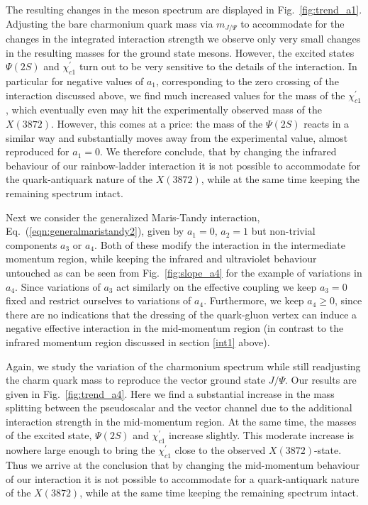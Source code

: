 The resulting changes in the meson spectrum are displayed in 
Fig.~\ref{fig:trend_a1}. Adjusting the bare charmonium quark mass via $m_{J/\Psi}$
to accommodate for the changes in the integrated interaction strength we
observe only very small changes in the resulting masses for the ground state mesons.
However, the excited states $\Psi(2S)$ and $\chi_{c1}^{\prime}$ turn out to be very sensitive 
to the details of the interaction. In particular for negative values of $a_1$,
corresponding to the zero crossing of the interaction discussed above, we find much
increased values for the mass of the $\chi_{c1}^{\prime}$, which eventually even may 
hit the experimentally observed mass of the $X(3872)$. However, this comes at a price: 
the mass of the $\Psi(2S)$ reacts in a similar way and substantially moves away from 
the experimental value, almost reproduced for $a_1=0$. We therefore conclude, that 
by changing the infrared behaviour of our rainbow-ladder interaction it is not possible 
to accommodate for the quark-antiquark nature of the $X(3872)$, while at the same time 
keeping the remaining spectrum intact.


%
%
%
%
%

Next we consider the generalized Maris-Tandy interaction, Eq.~(\ref{eqn:generalmaristandy2}), 
given by $a_1=0$, $a_2=1$ but non-trivial components $a_3$ or $a_4$. Both of these modify 
the interaction in the intermediate momentum region, while keeping the infrared and
ultraviolet behaviour untouched as can be seen from Fig.~\ref{fig:slope_a4} for the 
example of variations in $a_4$. Since variations of $a_3$ act similarly on the effective
coupling we keep $a_3=0$ fixed and restrict ourselves to variations of $a_4$.
Furthermore, we keep $a_4 \ge 0$, since there are no indications that the dressing of the
quark-gluon vertex can induce a negative effective interaction in the mid-momentum region
(in contrast to the infrared momentum region discussed in section \ref{int1} above).

Again, we study the variation of the charmonium spectrum while still readjusting
the charm quark mass to reproduce the vector ground state $J/\Psi$. Our results
are given in Fig.~\ref{fig:trend_a4}. Here we find a substantial increase in the
mass splitting between the pseudoscalar and the vector channel due to the additional
interaction strength in the mid-momentum region. At the same time, the masses of the
excited state, $\Psi(2S)$ and $\chi_{c1}^{\prime}$ increase slightly. This moderate increase 
is nowhere large enough to bring the $\chi_{c1}^{\prime}$ close to the observed $X(3872)$-state.
Thus we arrive at the conclusion that by changing the mid-momentum behaviour of our 
interaction it is not possible to accommodate for a quark-antiquark nature of the 
$X(3872)$, while at the same time keeping the remaining spectrum intact.
%
%
%
%
%
%
%
%
%

